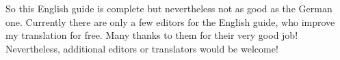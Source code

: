 So this English guide is complete but nevertheless not as good as the German
one. Currently there are only a few editors for the English guide, who improve
my translation for free. Many thanks to them for their very good job!
Nevertheless, additional editors or translators would be welcome!

\endinput


